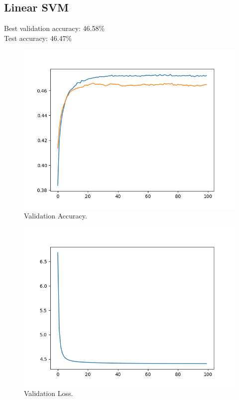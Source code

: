 \documentclass[12pt, letter]{article}
\begin{document}
\subsection{Linear SVM}
Best validation accuracy: 46.58\% \\
Test accuracy: 46.47\% \\
\begin{figure}[h]
  \centering
  \includegraphics[scale=0.60]{hog_svm_accuracy}
  \caption{Validation Accuracy.}
  \label{fig:eg}
\end{figure}
\begin{figure}[h]
  \centering
  \includegraphics[scale=0.60]{hog_svm_loss}
  \caption{Validation Loss.}
  \label{fig:eg}
\end{figure}
\end{document}
